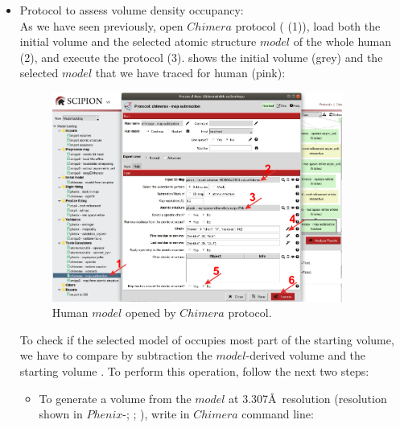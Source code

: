 \begin{itemize}
 \item Protocol  to assess volume density occupancy:\\
 
 As we have seen previously, open $Chimera$  protocol ( (1)), load both the initial volume and the selected atomic structure $model$ of the whole human  (2), and execute the protocol (3).  shows the initial volume  (grey) and the selected $model$ that we have traced for human  (pink):
 
 \begin{figure}[H]
    \centering 
    \captionsetup{width=.7\linewidth} 
    \includegraphics[width=0.90\textwidth]{Images/Fig42}
    \caption{Human  $model$ opened by $Chimera$  protocol.}
    \label{fig:chimera_operate_vol}
   \end{figure}
 
 To check if the selected model of  occupies most part of the starting volume, we have to compare by subtraction the $model$-derived volume and the starting volume . To perform this operation, follow the next two steps:\\
 
  \begin{itemize}
  
  \item To generate a volume from the $model$ at 3.307\AA\ resolution (resolution shown in $Phenix$-; ; ), write in $Chimera$ command line:\\
  

\end{itemize}
\end{itemize}
